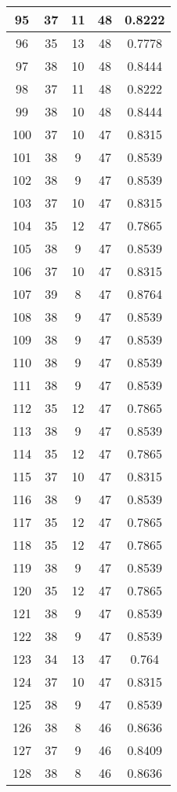 \documentclass[letterpaper, 12pt]{article}
\begin{document}
\begin{longtable}{|c|c|c|c|c|}
\hline
95 & 37 & 11 & 48 & 0.8222 \\
\hline
96 & 35 & 13 & 48 & 0.7778 \\
\hline
97 & 38 & 10 & 48 & 0.8444 \\
\hline
98 & 37 & 11 & 48 & 0.8222 \\
\hline
99 & 38 & 10 & 48 & 0.8444 \\
\hline
100 & 37 & 10 & 47 & 0.8315 \\
\hline
101 & 38 & 9 & 47 & 0.8539 \\
\hline
102 & 38 & 9 & 47 & 0.8539 \\
\hline
103 & 37 & 10 & 47 & 0.8315 \\
\hline
104 & 35 & 12 & 47 & 0.7865 \\
\hline
105 & 38 & 9 & 47 & 0.8539 \\
\hline
106 & 37 & 10 & 47 & 0.8315 \\
\hline
107 & 39 & 8 & 47 & 0.8764 \\
\hline
108 & 38 & 9 & 47 & 0.8539 \\
\hline
109 & 38 & 9 & 47 & 0.8539 \\
\hline
110 & 38 & 9 & 47 & 0.8539 \\
\hline
111 & 38 & 9 & 47 & 0.8539 \\
\hline
112 & 35 & 12 & 47 & 0.7865 \\
\hline
113 & 38 & 9 & 47 & 0.8539 \\
\hline
114 & 35 & 12 & 47 & 0.7865 \\
\hline
115 & 37 & 10 & 47 & 0.8315 \\
\hline
116 & 38 & 9 & 47 & 0.8539 \\
\hline
117 & 35 & 12 & 47 & 0.7865 \\
\hline
118 & 35 & 12 & 47 & 0.7865 \\
\hline
119 & 38 & 9 & 47 & 0.8539 \\
\hline
120 & 35 & 12 & 47 & 0.7865 \\
\hline
121 & 38 & 9 & 47 & 0.8539 \\
\hline
122 & 38 & 9 & 47 & 0.8539 \\
\hline
123 & 34 & 13 & 47 & 0.764 \\
\hline
124 & 37 & 10 & 47 & 0.8315 \\
\hline
125 & 38 & 9 & 47 & 0.8539 \\
\hline
126 & 38 & 8 & 46 & 0.8636 \\
\hline
127 & 37 & 9 & 46 & 0.8409 \\
\hline
128 & 38 & 8 & 46 & 0.8636 \\

\end{longtable}
\end{document}
